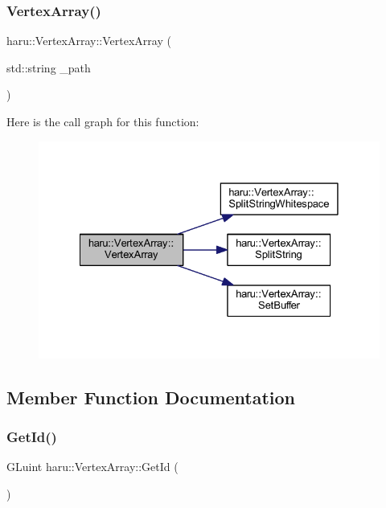\mbox{\label{classharu_1_1_vertex_array_a8d90e298064690ca3e0ad7fc9aec81b6}} 
\subsubsection{\texorpdfstring{Vertex\+Array()}{VertexArray()}\hspace{0.1cm}{\footnotesize\ttfamily [2/2]}}
{\footnotesize\ttfamily haru\+::\+Vertex\+Array\+::\+Vertex\+Array (\begin{DoxyParamCaption}\item[{std\+::string}]{\+\_\+path }\end{DoxyParamCaption})}

Here is the call graph for this function\+:
\nopagebreak
\begin{figure}[H]
\begin{center}
\leavevmode
\includegraphics[width=328pt]{classharu_1_1_vertex_array_a8d90e298064690ca3e0ad7fc9aec81b6_cgraph}
\end{center}
\end{figure}


\subsection{Member Function Documentation}
\mbox{\label{classharu_1_1_vertex_array_a9e0954bbf40bfd23997bd4a396e037c0}} 
\subsubsection{\texorpdfstring{Get\+Id()}{GetId()}}
{\footnotesize\ttfamily G\+Luint haru\+::\+Vertex\+Array\+::\+Get\+Id (\begin{DoxyParamCaption}{ }\end{DoxyParamCaption})}

